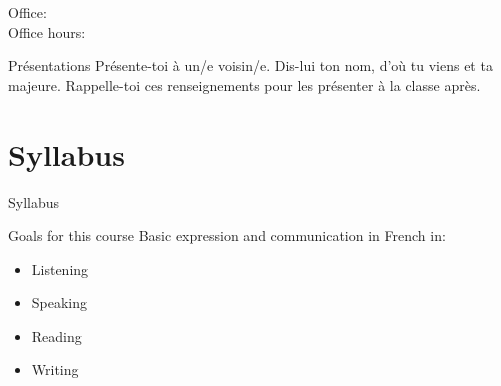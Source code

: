 \documentclass{beamer}
\subtitle[Bienvenue]{Bienvenue}
\begin{document}
  \begin{frame}
    \titlepage
    \tiny{Office: \\
          Office hours: }
  \end{frame}

  \begin{frame}{Présentations}
    Présente-toi à un/e voisin/e.
    Dis-lui ton \alert{nom}, d'\alert{où} tu viens et ta \alert{majeure}.
    Rappelle-toi ces renseignements pour les présenter à la classe après.
  \end{frame}

  \section{Syllabus}
  \begin{frame}
    \begin{center}
      \Huge{Syllabus}
    \end{center}
  \end{frame}

  \begin{frame}{Goals for this course}
    Basic expression and communication in French in:
    \begin{itemize}
      \item Listening
      \item Speaking
      \item Reading
      \item Writing
    \end{itemize}
  \end{frame}
\end{document}
